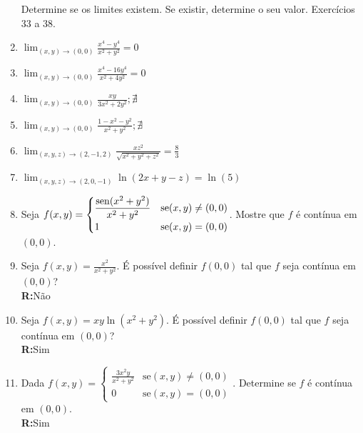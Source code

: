 \documentclass[oneside,a4paper,12pt]{article}
\newcommand{\sen}{{\rm sen}}
\newcommand{\R}{\\{\bf R:}}
\newcommand{\limm}{\displaystyle \lim}
\newcommand{\limmzero}{\displaystyle \lim_{(x,y)\to(0,0)}}
\begin{document}
\begin{enumerate}
     Determine se os limites existem. Se existir, determine o seu valor. Exercícios 33 a 38.
            \item $\limmzero\frac{x^4-y^4}{x^2+y^2}=0$
            \item $\limmzero\frac{x^4-16y^4}{x^2+4y^2}=0$
            \item $\limmzero\frac{xy}{3x^2+2y^2}; \nexists$
            \item $\limmzero\frac{1-x^2-y^2}{x^2+y^2}; \nexists$
            \item $\limm_{(x,y,z)\to(2,-1,2)}\frac{xz^2}{\sqrt{x^2+y^2+z^2}}=\frac{8}{3}$
            \item $\limm_{(x,y,z)\to(2,0,-1)}\ln(2x+y-z)=\ln(5)$
    \item Seja $f(x,y) = \begin{cases}
                             \displaystyle\frac{\sen(x^2+y^2)}{x^2+y^2}&\text{se}(x,y)\neq(0,0)\\
                             1&\text{se} (x,y) = (0,0)
                         \end{cases}$. Mostre que $f$ é contínua em $(0,0)$.
    \item Seja $f(x,y) = \displaystyle\frac{x^2}{x^2+y^2}$. É possível definir $f(0,0)$ tal que $f$ seja contínua em $(0,0)$? \R Não
    \item Seja $f(x,y)=xy\ln(x^2+y^2)$. É possível definir $f(0,0)$ tal que $f$ seja contínua em $(0,0)$? \R Sim
    \item Dada $f(x,y)=\begin{cases}
                           \displaystyle \frac{3x^2y}{x^2+y^2}&\text{se}(x,y)\neq(0,0)\\
                           0&\text{se}(x,y)=(0,0)
                       \end{cases}$. Determine se $f$ é contínua em $(0,0)$. \R Sim
   

\end{enumerate}
\end{document}
